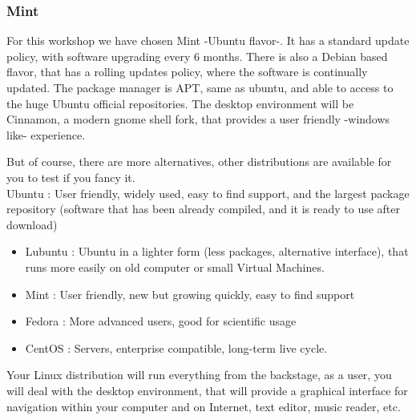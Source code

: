 \documentclass[a4paper]{article}
\begin{document}
\subsubsection{Mint}
For this workshop we have chosen Mint -Ubuntu flavor-. It has a standard update policy, with software upgrading every 6 months. There is also a Debian based flavor, that has a rolling updates policy, where the software is continually updated. The package manager is APT, same as ubuntu, and able to access to the huge Ubuntu official repositories. The desktop environment will be Cinnamon, a modern gnome shell fork, that provides a user friendly -windows like- experience.

But of course, there are more alternatives, other distributions are available for you to test if you fancy it.\\
Ubuntu : User friendly, widely used, easy to find support, and the largest package repository (software that has been already compiled, and it is ready to use after download) \\
\begin{itemize}
\item Lubuntu : Ubuntu in a lighter form (less packages, alternative interface), that runs more easily on old computer or small Virtual Machines. \\
\item Mint : User friendly, new but growing quickly, easy to find support \\
\item Fedora : More advanced users, good for scientific usage\\
\item CentOS : Servers, enterprise compatible, long-term live cycle.\\
\end{itemize}
Your Linux distribution will run everything from the backstage, as a user, you will deal with the desktop environment, that will provide a graphical interface for navigation within your computer and on Internet, text editor, music reader, etc. 
\end{document}
